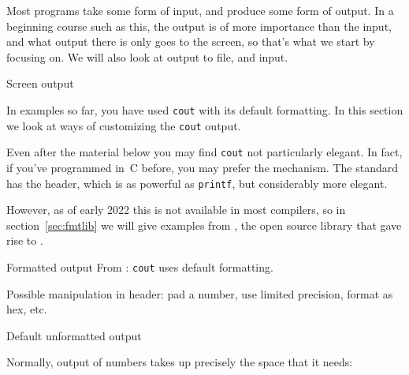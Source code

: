 
Most programs take some form of input, and produce some form of output.
In a beginning course such as this, the output is of more importance than
the input,
and what output there is only goes to the screen,
so that's what we start by focusing on.
We will also look at output to file, and input.

 {Screen output}
\label{sec:iomanip}

In examples so far, you have used \lstinline{cout}
with its default formatting.
In this section we look at ways of customizing
the \lstinline{cout} output.
\begin{remark}
  Even after the material below you may find \lstinline{cout}
  not particularly elegant.
  In fact, if you've programmed in~C before,
  you may prefer the  mechanism.
  The  standard
  has the  header, which
  is as powerful as \lstinline{printf}, but considerably more elegant.

  However, as of early 2022 this is not available in most compilers,
  so in section~\ref{sec:fmtlib}
  we will give examples from ,
  the open source library that gave rise to .
\end{remark}

\begin{block}{Formatted output}
  \label{sl:cformat}
  From :
  \lstinline{cout} uses default formatting.

  Possible manipulation in  header:
  pad a number, use limited precision, format as hex, etc.
\end{block}

\begin{slide}{Default unformatted output}
  \label{sl:unformat}
\end{slide}

Normally, output of numbers takes up precisely the space that it needs:

